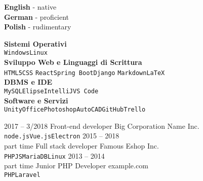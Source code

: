 \documentclass[9pt]{developercv} %
\begin{document}
\vspace{\baselineskip}
\begin{minipage}[t]{0.3\textwidth} %
	\vspace{-\baselineskip} %

	
	\textbf{English} - native\\
	\textbf{German} - proficient\\
	\textbf{Polish} - rudimentary
\end{minipage}
\hfill %
\begin{minipage}[t]{0.65\textwidth} %
	\vspace{-\baselineskip} %
	
	
	\textbf{Sistemi Operativi}\\
	\texttt{Windows}\slashsep\texttt{Linux}\\
	\textbf{Sviluppo Web e Linguaggi di Scrittura}\\
	\texttt{HTML5}\slashsep\texttt{CSS}
	\slashsep\texttt{React}\slashsep\texttt{Spring Boot}\slashsep\texttt{Django}
	\slashsep\texttt{Markdown}\slashsep\texttt{LaTeX}\\
	\textbf{DBMS e IDE}\\
	\texttt{MySQL}\slashsep\texttt{Elipse}\slashsep\texttt{IntelliJ}\slashsep\texttt{VS Code}\\
	\textbf{Software e Servizi}\\
	\texttt{Unity}\slashsep\texttt{Office}\slashsep\texttt{Photoshop}\slashsep\texttt{AutoCAD}\slashsep\texttt{GitHub}\slashsep\texttt{Trello}
\end{minipage}






\begin{entrylist}
	\entry
		{2017 -- 3/2018}
		{Front-end developer}
		{Big Corporation Name Inc.}
		{\lorem \lorem \lorem\\ \texttt{node.js}\slashsep\texttt{Vue.js}\slashsep\texttt{Electron}}
	\entry
		{2015 -- 2018\\\footnotesize{part time}}
		{Full stack developer}
		{Famous Eshop Inc.}
		{\lorem\lorem\\ \texttt{PHP}\slashsep\texttt{JS}\slashsep\texttt{MariaDB}\slashsep\texttt{Linux}}
	\entry
		{2013 -- 2014\\\footnotesize{part time}}
		{Junior PHP Developer}
		{example.com}
		{\lorem\lorem\\ \texttt{PHP}\slashsep\texttt{Laravel}}
\end{entrylist}
\end{document}
